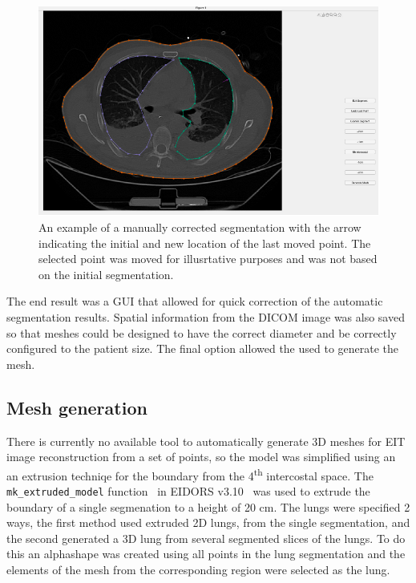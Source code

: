 \begin{figure}
	\centering
	\includegraphics[width=\textwidth]{chapter5-CT_to_mesh/imgs/SegmentationAppCorrected.pdf}
	\caption[Manually corrected segmentation]{\label{fig:seg-app-corrected}%
	An example of a manually corrected segmentation with the arrow indicating the initial
	and new location of the last moved point. The selected point was moved for illusrtative
	purposes and was not based on the initial segmentation.}
\end{figure}

The end result was a GUI that allowed for quick correction of the automatic segmentation 
results. Spatial information from the DICOM image was also saved so that meshes could be
designed to have the correct diameter and be correctly configured to the patient size.
The final option allowed the used to generate the mesh. 

\subsection{Mesh generation} \label{sec:mesh-gen}
There is currently no available tool to automatically generate 3D meshes for 
EIT image reconstruction from a set of points, so the model was simplified using an
an extrusion techniqe for the boundary from the 4\textsuperscript{th} intercostal space. 
The \verb!mk_extruded_model! 
function~\parencite{grychtol_fem_2013}
in EIDORS v3.10~\parencite{adler_eidors_2017} was used to extrude the boundary 
of a single segmenation to a height of 20 cm.
The  lungs were specified 2 ways, the first method used extruded 2D lungs, 
from the single segmentation, and the second generated a 3D lung from several segmented
slices of the lungs. 
To do this an alphashape was created using all points in the 
lung segmentation and the elements of the mesh from the corresponding region 
were selected as the lung. 

